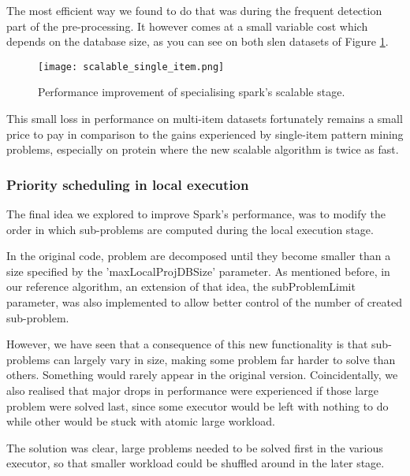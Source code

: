 \documentclass{eplmastersthesis}
\begin{document}
The most efficient way we found to do that was during the frequent detection part of the pre-processing. It however comes at a small variable cost which depends on the database size, as you can see on both slen datasets of Figure \ref{fig:scalable_single_item}. \newline

\begin{figure}[h]
  \centering
  \texttt{[image: scalable\_single\_item.png]}
  \caption{Performance improvement of specialising spark's scalable stage.}
  \label{fig:scalable_single_item}
\end{figure}

This small loss in performance on multi-item datasets fortunately remains a small price to pay in comparison to the gains experienced by single-item pattern mining problems, especially on protein where the new scalable algorithm is twice as fast.

\subsubsection{Priority scheduling in local execution}

The final idea we explored to improve Spark's performance, was to modify the order in which sub-problems are computed during the local execution stage. \newline

In the original code, problem are decomposed until they become smaller than a size specified by the 'maxLocalProjDBSize' parameter. As mentioned before, in our reference algorithm, an extension of that idea, the subProblemLimit parameter, was also implemented to allow better control of the number of created sub-problem. \newline

However, we have seen that a consequence of this new functionality is that sub-problems can largely vary in size, making some problem far harder to solve than others. Something would rarely appear in the original version. Coincidentally, we also realised that major drops in performance were experienced if those large problem were solved last, since some executor would be left with nothing to do while other would be stuck with atomic large workload.
\newline

The solution was clear, large problems needed to be solved first in the various executor, so that smaller workload could be shuffled around in the later stage. 
\end{document}
